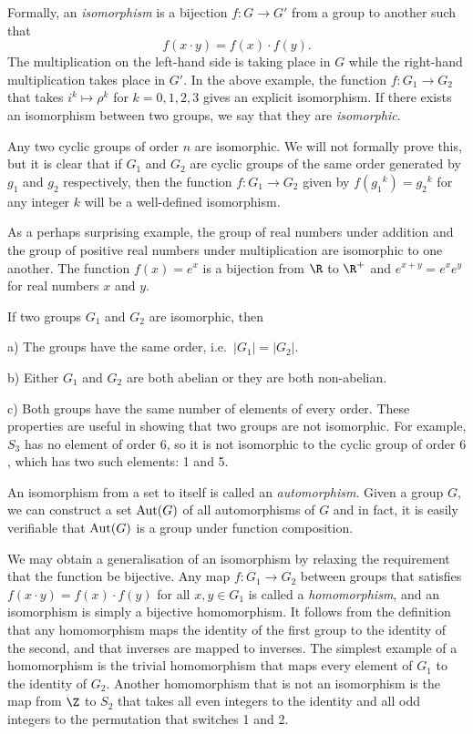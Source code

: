 Formally, an {\it isomorphism} is a bijection $f:G\rightarrow G'$ from a group to another such that
$$f(x\cdot y) = f(x) \cdot f(y).$$
The multiplication on the left-hand side is taking place in $G$ while the right-hand multiplication takes place in $G'$. In the above example, the function $f : G_1 \rightarrow G_2$ that takes $i^k \mapsto \rho^k$ for $k=0,1,2,3$ gives an explicit isomorphism. If there exists an isomorphism between two groups, we say that they are {\it isomorphic}.

Any two cyclic groups of order $n$ are isomorphic. We will not formally prove this, but it is clear that if $G_1$ and $G_2$ are cyclic groups of the same order generated by $g_1$ and $g_2$ respectively, then the function $f : G_1 \rightarrow G_2$ given by $f({g_1}^k) = {g_2}^k$ for any integer $k$ will be a well-defined isomorphism.

As a perhaps surprising example, the group of real numbers under addition and the group of positive real numbers under multiplication are isomorphic to one another. The function $f(x) = e^x$ is a bijection from $\R$ to $\R^+$ and $e^{x+y} = e^xe^y$ for real numbers $x$ and $y$.

If two groups $G_1$ and $G_2$ are isomorphic, then
\medskip
\item {a)} The groups have the same order, i.e.\ $|G_1| = |G_2|$.
\smallskip
\item {b)} Either $G_1$ and $G_2$ are both abelian or they are both non-abelian.
\smallskip
\item {c)} Both groups have the same number of elements of every order.
\medskip
These properties are useful in showing that two groups are not isomorphic. For example, $S_3$ has no element of order $6$, so it is not isomorphic to the cyclic group of order $6$, which has two such elements: 1 and 5.

An isomorphism from a set to itself is called an {\it automorphism}. Given a group $G$, we can construct a set $\mathop{\rm Aut}\nolimits(G)$ of all automorphisms of $G$ and in fact, it is easily verifiable that $\mathop{\rm Aut}\nolimits(G)$ is a group under function composition.

We may obtain a generalisation of an isomorphism by relaxing the requirement that the function be bijective. Any map $f : G_1 \rightarrow G_2$ between groups that satisfies $f(x\cdot y) = f(x)\cdot f(y)$ for all $x,y\in G_1$ is called a {\it homomorphism}, and an isomorphism is simply a bijective homomorphism. It follows from the definition that any homomorphism maps the identity of the first group to the identity of the second, and that inverses are mapped to inverses. The simplest example of a homomorphism is the trivial homomorphism that maps every element of $G_1$ to the identity of $G_2$. Another homomorphism that is not an isomorphism is the map from $\Z$ to $S_2$ that takes all even integers to the identity and all odd integers to the permutation that switches 1 and 2.

